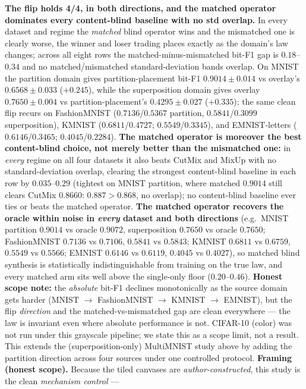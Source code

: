 \documentclass[11pt]{article}
\begin{document}
\textbf{The flip holds 4/4, in both directions, and the matched operator dominates every
content-blind baseline with no std overlap.} In every dataset and regime the \emph{matched}
blind operator wins and the mismatched one is clearly worse, the winner and loser trading
places exactly as the domain's law changes; across all eight rows the matched-minus-mismatched
bit-F1 gap is $0.18$--$0.34$ and no matched/mismatched standard-deviation bands overlap. On
MNIST the partition domain gives partition-placement bit-F1 $0.9014 \pm 0.014$ vs overlay's
$0.6568 \pm 0.033$ ($+0.245$), while the superposition domain gives overlay $0.7650 \pm 0.004$
vs partition-placement's $0.4295 \pm 0.027$ ($+0.335$); the same clean flip recurs on
FashionMNIST ($0.7136$/$0.5367$ partition, $0.5841$/$0.3099$ superposition), KMNIST
($0.6811$/$0.4727$; $0.5549$/$0.3345$), and EMNIST-letters ($0.6146$/$0.3465$;
$0.4045$/$0.2284$). \textbf{The matched operator is moreover the best content-blind choice,
not merely better than the mismatched one:} in \emph{every} regime on all four datasets it
also beats CutMix and MixUp with no standard-deviation overlap, clearing the strongest
content-blind baseline in each row by $0.035$--$0.29$ (tightest on MNIST partition, where
matched $0.9014$ still clears CutMix $0.8660$: $0.887 > 0.868$, no overlap); no content-blind
baseline ever ties or beats the matched operator.
\textbf{The matched operator recovers the oracle within noise in \emph{every} dataset and
both directions} (e.g.\ MNIST partition $0.9014$ vs oracle $0.9072$, superposition $0.7650$
vs oracle $0.7650$; FashionMNIST $0.7136$ vs $0.7106$, $0.5841$ vs $0.5843$; KMNIST
$0.6811$ vs $0.6759$, $0.5549$ vs $0.5566$; EMNIST $0.6146$ vs $0.6119$, $0.4045$ vs
$0.4027$), so matched blind synthesis is statistically indistinguishable from training on
the true law, and every matched arm sits well above the single-only floor ($0.20$--$0.46$).
\textbf{Honest scope note:} the \emph{absolute} bit-F1 declines monotonically as the source
domain gets harder (MNIST $\to$ FashionMNIST $\to$ KMNIST $\to$ EMNIST), but the flip
\emph{direction} and the matched-vs-mismatched gap are clean everywhere --- the law is
invariant even where absolute performance is not. CIFAR-10 (color) was not run under this
grayscale pipeline; we state this as a scope limit, not a result. This extends the
(superposition-only) MultiMNIST study above by adding the partition direction across four
sources under one controlled protocol. \textbf{Framing (honest scope).} Because the tiled
canvases are \emph{author-constructed}, this study is the clean \emph{mechanism control} ---
\end{document}
